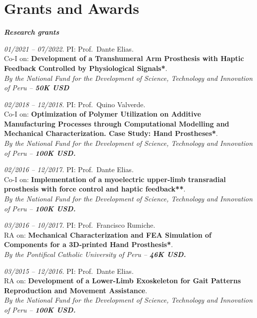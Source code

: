 \documentclass[a4paper,10pt]{article}
\newcommand{\cvdate}[1]{\textit{#1}}
\begin{document}
\section{Grants and Awards}

\textbf{\textit{Research grants}}

\vspace{2pt}
\cvdate{01/2021 -- 07/2022.} PI: Prof.\ Dante Elias.\\
Co-I on: \textbf{Development of a Transhumeral Arm Prosthesis with Haptic Feedback Controlled by
Physiological Signals*}.\\
\textit{By the National Fund for the Development of Science, Technology and Innovation of Peru --
\textbf{50K USD}}

\vspace{3pt}
\cvdate{02/2018 -- 12/2018.} PI: Prof.\ Quino Valverde.\\
Co-I on: \textbf{Optimization of Polymer Utilization on Additive Manufacturing Processes through
Computational Modelling and Mechanical Characterization. Case Study: Hand Prostheses*}.\\
\textit{By the National Fund for the Development of Science, Technology and Innovation of Peru --
\textbf{100K USD.}}

\vspace{3pt}
\cvdate{02/2016 -- 12/2017.} PI: Prof.\ Dante Elias.\\
Co-I on: \textbf{Implementation of a myoelectric upper-limb transradial prosthesis with force
control and haptic feedback**}.\\
\textit{By the National Fund for the Development of Science, Technology and Innovation of Peru --
\textbf{100K USD.}}

\vspace{3pt}
\cvdate{03/2016 -- 10/2017.} PI: Prof.\ Francisco Rumiche.\\
RA on: \textbf{Mechanical Characterization and FEA Simulation of Components for a 3D-printed Hand
Prosthesis*}.\\
\textit{By the Pontifical Catholic University of Peru -- \textbf{46K USD.}}

\vspace{3pt}
\cvdate{03/2015 -- 12/2016.} PI: Prof.\ Dante Elias.\\
RA on: \textbf{Development of a Lower-Limb Exoskeleton for Gait Patterns Reproduction and
Movement Assistance}.\\
\textit{By the National Fund for the Development of Science, Technology and Innovation of Peru --
\textbf{100K USD.}}
\end{document}
